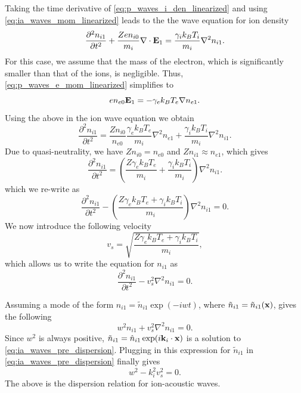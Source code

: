 \documentclass[a4paper,11pt]{report}
\begin{document}
Taking the time derivative of \cref{eq:p_waves_i_den_linearized} and using \cref{eq:ia_waves_mom_linearized} leads to the the wave equation for ion density
\begin{equation}
    \label{eq:ia_waves_den_combined}
    \frac{\partial^2 n_{i1}}{\partial t^2} + \frac{Z e n_{i0}}{m_i} \nabla \cdot \mathbf{E}_1 = \frac{\gamma_i k_B T_i}{m_i} \nabla^2 n_{i1}.
\end{equation}
For this case, we assume that the mass of the electron, which is significantly smaller than that of the ions, is negligible. Thus, \cref{eq:p_waves_e_mom_linearized} simplifies to 
\begin{equation}
    \label{eq:ia_waves_E}
    e n_{e0} \mathbf{E}_1 = -\gamma_e k_B T_e \nabla n_{e1}.
\end{equation}
Using the above in the ion wave equation we obtain
\begin{equation*}
    \frac{\partial^2 n_{i1}}{\partial t^2} = \frac{Z n_{i0}}{ n_{e0}} \frac{\gamma_e k_B T_e}{m_i} \nabla^2 n_{e1} + \frac{\gamma_i k_B T_i}{m_i} \nabla^2 n_{i1}.
\end{equation*}
Due to quasi-neutrality, we have $Z n_{i0} = n_{e0}$ and $Z n_{i1} \approx n_{e1}$, which gives
\begin{equation*}
    \frac{\partial^2 n_{i1}}{\partial t^2} = \left ( \frac{Z \gamma_e k_B T_e}{m_i} + \frac{\gamma_i k_B T_i}{m_i} \right ) \nabla^2 n_{i1}.
\end{equation*}
which we re-write as
\begin{equation}
    \frac{\partial^2 n_{i1}}{\partial t^2} - \left ( \frac{Z \gamma_e k_B T_e + \gamma_i k_B T_i}{m_i} \right ) \nabla^2 n_{i1} = 0.
\end{equation}
We now introduce the following velocity
\begin{equation}
    v_s = \sqrt{ \frac{Z \gamma_e k_B T_e + \gamma_i k_B T_i }{m_i} },
\end{equation}
which allows us to write the equation for $n_{i1}$ as
\begin{equation}
    \frac{\partial^2 n_{i1}}{\partial t^2} - v_s^2 \nabla^2 n_{i1} = 0.
\end{equation}

Assuming a mode of the form $n_{i1} = \tilde{n}_{i1} \exp (-iwt)$, where $\tilde{n}_{i1} = \tilde{n}_{i1}(\mathbf{x})$, gives the following
\begin{equation}
    \label{eq:ia_waves_pre_dispersion}
    w^2 n_{i1} + v_s^2 \nabla^2 n_{i1} = 0.
\end{equation}
Since $w^2$ is always positive, $\tilde{n}_{i1} = \hat{n}_{i1} \exp (i \mathbf{k}_i \cdot \mathbf{x})$ is a solution to \cref{eq:ia_waves_pre_dispersion}. Plugging in this expression for $\tilde{n}_{i1}$ in \cref{eq:ia_waves_pre_dispersion} finally gives
\begin{equation}
    w^2 - k_i^2 v_s^2 = 0.
\end{equation}
The above is the dispersion relation for ion-acoustic waves.
\end{document}
